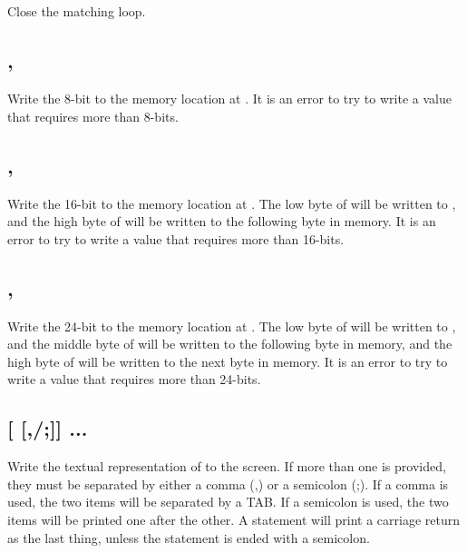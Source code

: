 \documentclass{report}
\begin{document}
    \subsection*{}

    Close the matching  loop.

    \subsection*{ , }

    Write the 8-bit  to the memory location at .
    It is an error to try to write a value that requires more than 8-bits.

    \subsection*{ , }

    Write the 16-bit  to the memory location at .
    The low byte of  will be written to , and
    the high byte of  will be written to the following byte in memory.
    It is an error to try to write a value that requires more than 16-bits.    

    \subsection*{ , }

    Write the 24-bit  to the memory location at .
    The low byte of  will be written to , and
    the middle byte of  will be written to the following byte in memory,
    and the high byte of  will be written to the next byte in memory.
    It is an error to try to write a value that requires more than 24-bits.  

    \subsection*{ [ [,/;]] ...}

    Write the textual representation of  to the screen.
    If more than one  is provided, they must be separated by either a comma (,)
    or a semicolon (;).
    If a comma is used, the two items will be separated by a TAB.
    If a semicolon is used, the two items will be printed one after the other.
    A  statement will print a carriage return as the last thing, unless the
    statement is ended with a semicolon.
\end{document}
